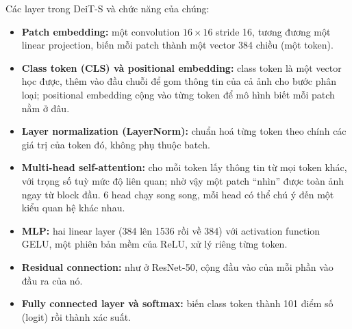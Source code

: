 \documentclass[11pt,a4paper]{article}
\begin{document}
Các layer trong DeiT-S và chức năng của chúng:
\begin{itemize}
\item \textbf{Patch embedding:} một convolution \(16\times16\) stride 16, tương đương một linear projection, biến mỗi patch thành một vector 384 chiều (một token).
\item \textbf{Class token (CLS) và positional embedding:} class token là một vector học được, thêm vào đầu chuỗi để gom thông tin của cả ảnh cho bước phân loại; positional embedding cộng vào từng token để mô hình biết mỗi patch nằm ở đâu.
\item \textbf{Layer normalization (LayerNorm):} chuẩn hoá từng token theo chính các giá trị của token đó, không phụ thuộc batch.
\item \textbf{Multi-head self-attention:} cho mỗi token lấy thông tin từ mọi token khác, với trọng số tuỳ mức độ liên quan; nhờ vậy một patch ``nhìn'' được toàn ảnh ngay từ block đầu. 6 head chạy song song, mỗi head có thể chú ý đến một kiểu quan hệ khác nhau.
\item \textbf{MLP:} hai linear layer (384 lên 1536 rồi về 384) với activation function GELU, một phiên bản mềm của ReLU, xử lý riêng từng token.
\item \textbf{Residual connection:} như ở ResNet-50, cộng đầu vào của mỗi phần vào đầu ra của nó.
\item \textbf{Fully connected layer và softmax:} biến class token thành 101 điểm số (logit) rồi thành xác suất.
\end{itemize}
\end{document}
